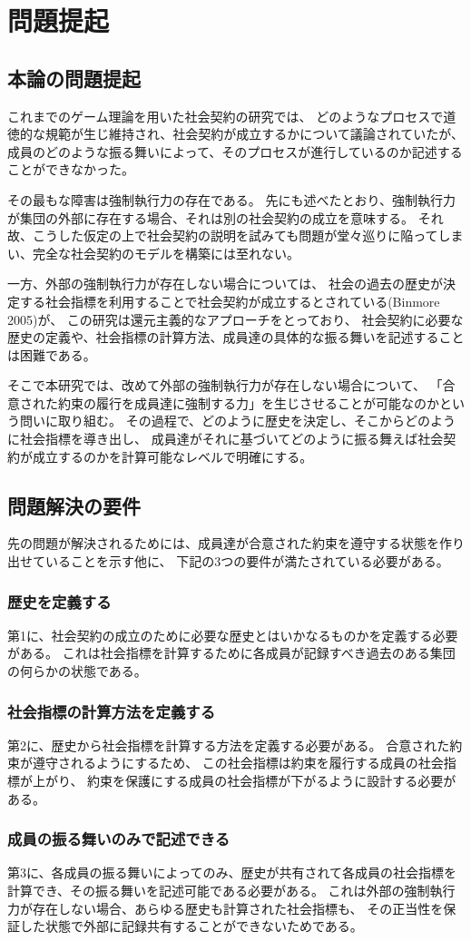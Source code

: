 \chapter{問題提起}
\section{本論の問題提起}
これまでのゲーム理論を用いた社会契約の研究では、
どのようなプロセスで道徳的な規範が生じ維持され、社会契約が成立するかについて議論されていたが、
成員のどのような振る舞いによって、そのプロセスが進行しているのか記述することができなかった。

その最もな障害は強制執行力の存在である。
先にも述べたとおり、強制執行力が集団の外部に存在する場合、それは別の社会契約の成立を意味する。
それ故、こうした仮定の上で社会契約の説明を試みても問題が堂々巡りに陥ってしまい、完全な社会契約のモデルを構築には至れない。

一方、外部の強制執行力が存在しない場合については、
社会の過去の歴史が決定する社会指標を利用することで社会契約が成立するとされている(Binmore 2005\cite{binmore2005})が、
この研究は還元主義的なアプローチをとっており、
社会契約に必要な歴史の定義や、社会指標の計算方法、成員達の具体的な振る舞いを記述することは困難である。

そこで本研究では、改めて外部の強制執行力が存在しない場合について、
「合意された約束の履行を成員達に強制する力」を生じさせることが可能なのかという問いに取り組む。
その過程で、どのように歴史を決定し、そこからどのように社会指標を導き出し、
成員達がそれに基づいてどのように振る舞えば社会契約が成立するのかを計算可能なレベルで明確にする。

\section{問題解決の要件}
先の問題が解決されるためには、成員達が合意された約束を遵守する状態を作り出せていることを示す他に、
下記の3つの要件が満たされている必要がある。

\subsection{歴史を定義する}
第1に、社会契約の成立のために必要な歴史とはいかなるものかを定義する必要がある。
これは社会指標を計算するために各成員が記録すべき過去のある集団の何らかの状態である。


\subsection{社会指標の計算方法を定義する}
第2に、歴史から社会指標を計算する方法を定義する必要がある。
合意された約束が遵守されるようにするため、
この社会指標は約束を履行する成員の社会指標が上がり、
約束を保護にする成員の社会指標が下がるように設計する必要がある。


\subsection{成員の振る舞いのみで記述できる}
第3に、各成員の振る舞いによってのみ、歴史が共有されて各成員の社会指標を計算でき、その振る舞いを記述可能である必要がある。
これは外部の強制執行力が存在しない場合、あらゆる歴史も計算された社会指標も、
その正当性を保証した状態で外部に記録共有することができないためである。
